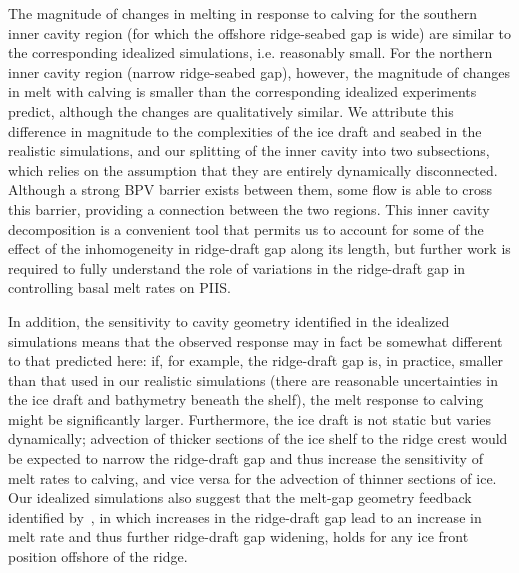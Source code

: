 \documentclass[draft]{agujournal2019}
\begin{document}
The magnitude of changes in melting in response to calving for the southern inner cavity region (for which the offshore ridge-seabed gap is wide) are similar to the corresponding idealized simulations, i.e. reasonably small. For the northern inner cavity region (narrow ridge-seabed gap), however, the magnitude of changes in melt with calving is smaller than the corresponding idealized experiments predict, although the changes are qualitatively similar. We attribute this difference in magnitude to the complexities of the ice draft and seabed in the realistic simulations, and our splitting of the inner cavity into two subsections, which relies on the assumption that they are entirely dynamically disconnected. Although a strong BPV barrier exists between them, some flow is able to cross this barrier, providing a connection between the two regions. This inner cavity decomposition is a convenient tool that permits us to account for some of the effect of the inhomogeneity in ridge-draft gap along its length, but further work is required to fully understand the role of variations in the ridge-draft gap in controlling basal melt rates on PIIS.

In addition, the sensitivity to cavity geometry identified in the idealized simulations means that the observed response may in fact be somewhat different to that predicted here: if, for example, the ridge-draft gap is, in practice, smaller than that used in our realistic simulations (there are reasonable uncertainties in the ice draft and bathymetry beneath the shelf), the melt response to calving might be significantly larger. Furthermore, the ice draft is not static but varies dynamically; advection of thicker sections of the ice shelf to the ridge crest would be expected to narrow the ridge-draft gap and thus increase the sensitivity of melt rates to calving, and vice versa for the advection of thinner sections of ice. Our idealized simulations also suggest that the melt-gap geometry feedback identified by~\cite{DeRydt2014JGeophysResOceans}, in which increases in the ridge-draft gap lead to an increase in melt rate and thus further ridge-draft gap widening, holds for any ice front position offshore of the ridge.
\end{document}
